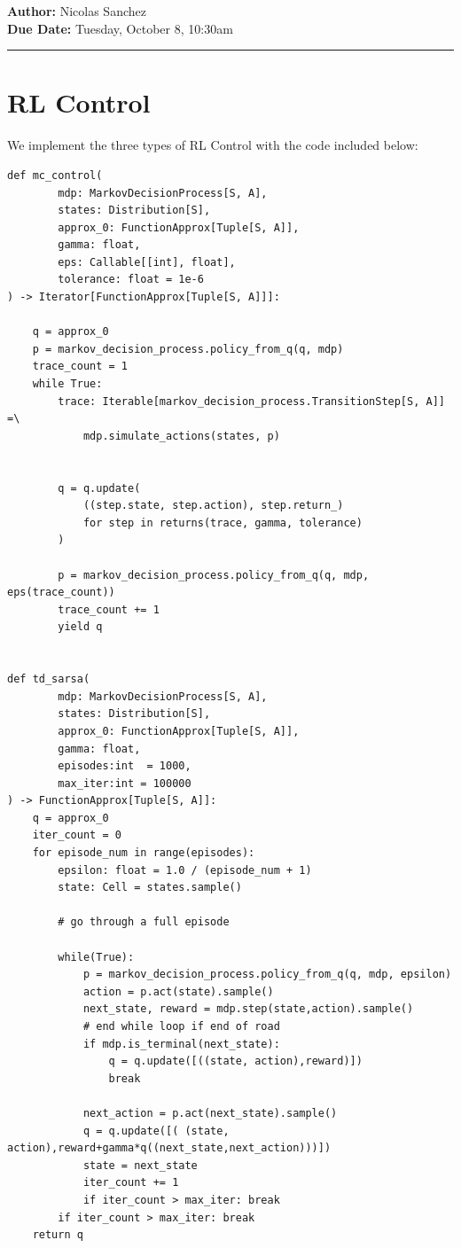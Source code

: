 \documentclass{article}[12pt]
\newcommand{\headings}[4]{\noindent {\bf Assignment 13 CME241} \hfill {{\bf Author:} Nicolas Sanchez} \\
{} \hfill {{\bf Due Date:} #2} \\

\rule[0.1in]{\textwidth}{0.025in}
}
\begin{document}
\headings{\#1}{Tuesday, October 8, 10:30am}\section{} 

\section{RL Control}
We implement the three types of RL Control with the code included below:
\begin{lstlisting}
def mc_control(
        mdp: MarkovDecisionProcess[S, A],
        states: Distribution[S],
        approx_0: FunctionApprox[Tuple[S, A]],
        gamma: float,
        eps: Callable[[int], float],
        tolerance: float = 1e-6
) -> Iterator[FunctionApprox[Tuple[S, A]]]:

    q = approx_0
    p = markov_decision_process.policy_from_q(q, mdp)
    trace_count = 1
    while True:
        trace: Iterable[markov_decision_process.TransitionStep[S, A]] =\
            mdp.simulate_actions(states, p)


        q = q.update(
            ((step.state, step.action), step.return_)
            for step in returns(trace, gamma, tolerance)
        )

        p = markov_decision_process.policy_from_q(q, mdp, eps(trace_count))
        trace_count += 1
        yield q


def td_sarsa(
        mdp: MarkovDecisionProcess[S, A],
        states: Distribution[S],
        approx_0: FunctionApprox[Tuple[S, A]],
        gamma: float,
        episodes:int  = 1000,
        max_iter:int = 100000
) -> FunctionApprox[Tuple[S, A]]:
    q = approx_0
    iter_count = 0
    for episode_num in range(episodes):
        epsilon: float = 1.0 / (episode_num + 1)
        state: Cell = states.sample()
        
        # go through a full episode

        while(True):
            p = markov_decision_process.policy_from_q(q, mdp, epsilon)
            action = p.act(state).sample()
            next_state, reward = mdp.step(state,action).sample()            
            # end while loop if end of road
            if mdp.is_terminal(next_state):
                q = q.update([((state, action),reward)])
                break

            next_action = p.act(next_state).sample()
            q = q.update([( (state, action),reward+gamma*q((next_state,next_action)))])
            state = next_state
            iter_count += 1
            if iter_count > max_iter: break
        if iter_count > max_iter: break
    return q



\end{lstlisting}
\end{document}
